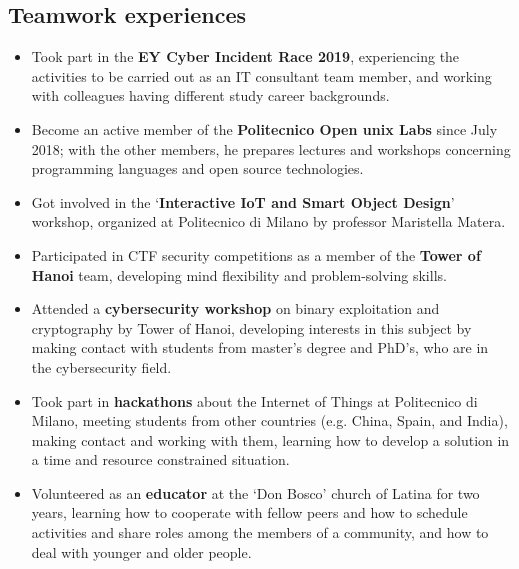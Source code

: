     \subsection{Teamwork experiences}
    \begin{itemize}
        \item Took part in the \textbf{EY Cyber Incident Race 2019}, experiencing the activities to be carried out as an IT consultant team member, and working with colleagues having different study career backgrounds.
        \item Become an active member of the \textbf{Politecnico Open unix Labs} since July 2018; with the other members, he prepares lectures and workshops concerning programming languages and open source technologies.
        \item Got involved in the ‘\textbf{Interactive IoT and Smart Object Design}’ workshop, organized at Politecnico di Milano by professor Maristella Matera.
        \item Participated in CTF security competitions as a member of the \textbf{Tower of Hanoi} team, developing mind flexibility and problem-solving skills.
        \item Attended a \textbf{cybersecurity workshop} on binary exploitation and cryptography by Tower of Hanoi, developing interests in this subject by making contact with students from master's degree and PhD's, who are in the cybersecurity field.
        \item Took part in \textbf{hackathons} about the Internet of Things at Politecnico di Milano, meeting students from other countries (e.g. China, Spain, and India), making contact and working with them, learning how to develop a solution in a time and resource constrained situation.
        \item Volunteered as an \textbf{educator} at the ‘Don Bosco’ church of Latina for two years, learning how to cooperate with fellow peers and how to schedule activities and share roles among the members of a community, and how to deal with younger and older people.
    \end{itemize}

    \bigskip
